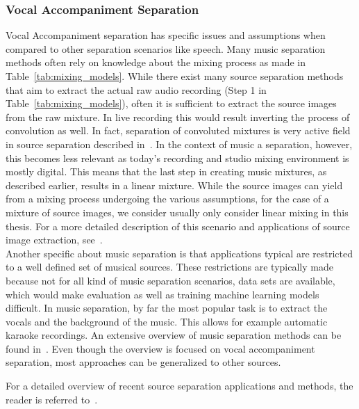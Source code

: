 \subsubsection*{Vocal Accompaniment Separation}
Vocal Accompaniment separation has specific issues and assumptions when compared to other separation scenarios like speech.
Many music separation methods often rely on knowledge about the mixing process as made in Table~\ref{tab:mixing_models}.
While there exist many source separation methods that aim to extract the actual raw audio recording (Step 1 in  Table~\ref{tab:mixing_models}), often it is sufficient to extract the source images from the raw mixture.
In live recording this would result inverting the process of convolution as well.
In fact, separation of convoluted mixtures is very active field in source separation described in~\cite{pedersen07}.
In the context of music a separation, however, this becomes less relevant as today's recording and studio mixing environment is mostly digital.
This means that the last step in creating music mixtures, as described earlier, results in a linear mixture.
While the source images can yield from a mixing process undergoing the various assumptions, for the case of a mixture of source images, we consider usually only consider linear mixing in this thesis.
For a more detailed description of this scenario and applications of source image extraction, see~\cite{sturmel12}.\\

Another specific about music separation is that applications typical are restricted to a well defined set of musical sources.
These restrictions are typically made because not for all kind of music separation scenarios, data sets are available, which would make evaluation as well as training machine learning models difficult.
In music separation, by far the most popular task is to extract the vocals and the background of the music.
This allows for example automatic karaoke recordings.
An extensive overview of music separation methods can be found in~\cite{rafii18}.
Even though the overview is focused on vocal accompaniment separation, most approaches can be generalized to other sources.
\par
For a detailed overview of recent source separation applications and methods, the reader is referred to~\cite{vincent18,comon10, rafii}.

